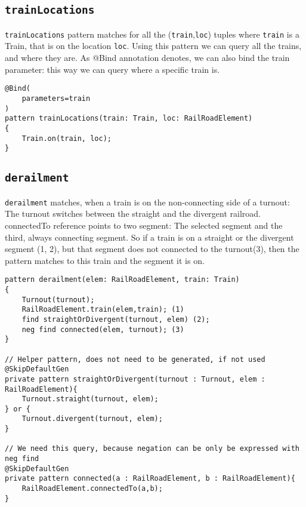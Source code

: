 \subsection{\texttt{trainLocations}}
\begin{minipage}{\textwidth}

\texttt{trainLocations} pattern matches for all the (\texttt{train},\texttt{loc}) tuples where \texttt{train} is a Train, that is on the location \texttt{loc}.
Using this pattern we can query all the trains, and where they are.
As @Bind annotation denotes, we can also bind the train parameter: this way we can query where a specific train is.
\begin{lstlisting}[language = vql]
@Bind(
	parameters=train
)
pattern trainLocations(train: Train, loc: RailRoadElement)
{
	Train.on(train, loc);
}
\end{lstlisting}
\end{minipage}
\vspace{\belowdisplayskip}




\subsection{\texttt{derailment}}
\begin{minipage}{\textwidth}
	
\texttt{derailment} matches, when a train is on the non-connecting side of a turnout:
The turnout switches between the straight and the divergent railroad. 
connectedTo reference points to two segment: The selected segment and the third, always connecting segment.
So if a train is on a straight or the divergent segment (1, 2), but that segment does not connected to the turnout(3), then the pattern matches to this train and the segment it is on.


\begin{lstlisting}[language = vql]
pattern derailment(elem: RailRoadElement, train: Train)
{
	Turnout(turnout);
	RailRoadElement.train(elem,train); (1)
	find straightOrDivergent(turnout, elem) (2);
	neg find connected(elem, turnout); (3)
}

// Helper pattern, does not need to be generated, if not used
@SkipDefaultGen
private pattern straightOrDivergent(turnout : Turnout, elem : RailRoadElement){
	Turnout.straight(turnout, elem);
} or {
	Turnout.divergent(turnout, elem);
}

// We need this query, because negation can be only be expressed with neg find
@SkipDefaultGen
private pattern connected(a : RailRoadElement, b : RailRoadElement){
	RailRoadElement.connectedTo(a,b);
}


\end{lstlisting}
\end{minipage}
\vspace{\belowdisplayskip}


